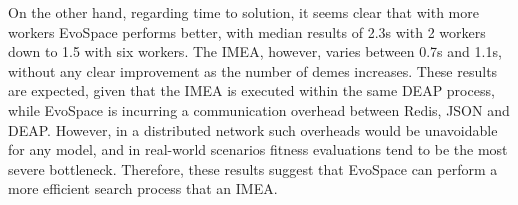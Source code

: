 On the other hand, regarding time to solution, it seems clear that with more workers EvoSpace performs better, with median results of 2.3s with 2 workers down to 1.5 with six workers.
The IMEA, however, varies between 0.7s and 1.1s, without any clear improvement as the number of demes increases.
These results are expected, given that the IMEA is executed within the same DEAP process, while EvoSpace is incurring a communication overhead between Redis, JSON and DEAP.
However, in a distributed network such overheads would be unavoidable for any model, and in real-world scenarios fitness evaluations tend to be the most severe bottleneck.
Therefore, these results suggest that EvoSpace can perform a more efficient search process that an IMEA.


\begin{figure}[t]
    \centering
\end{figure}
